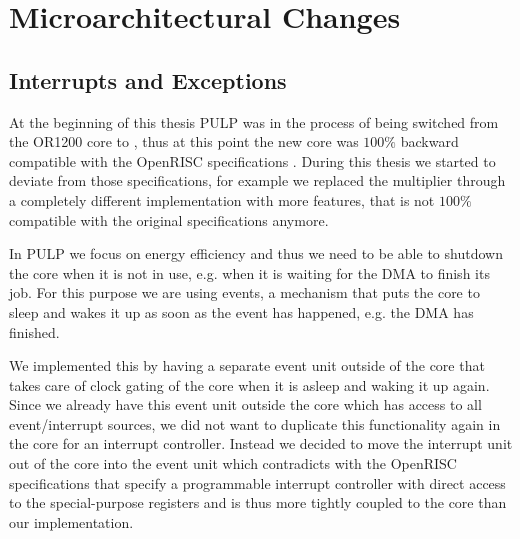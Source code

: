 
\chapter{Microarchitectural Changes}

\label{chapter:changes}



\section{Interrupts and Exceptions}


At the beginning of this thesis PULP was in the process of being switched from
the OR1200 core to \orion, thus at this point the new \orion core was $100\%$
backward compatible with the OpenRISC specifications \cite{OR1KSPEC}.  During
this thesis we started to deviate from those specifications, for example we
replaced the multiplier through a completely different implementation with more
features, that is not $100\%$ compatible with the original specifications
anymore.

In PULP we focus on energy efficiency and thus we need to be able to shutdown
the core when it is not in use, e.g. when it is waiting for the \gls{DMA} to
finish its job. For this purpose we are using events, a mechanism that puts the
core to sleep and wakes it up as soon as the event has happened, e.g. the
\gls{DMA} has finished.

We implemented this by having a separate event unit outside of the core that
takes care of clock gating of the core when it is asleep and waking it up
again. Since we already have this event unit outside the core which has access
to all event/interrupt sources, we did not want to duplicate this functionality
again in the core for an interrupt controller. Instead we decided to move the
interrupt unit out of the core into the event unit which contradicts with the
OpenRISC specifications that specify a programmable interrupt controller with
direct access to the special-purpose registers and is thus more tightly coupled
to the core than our implementation.

